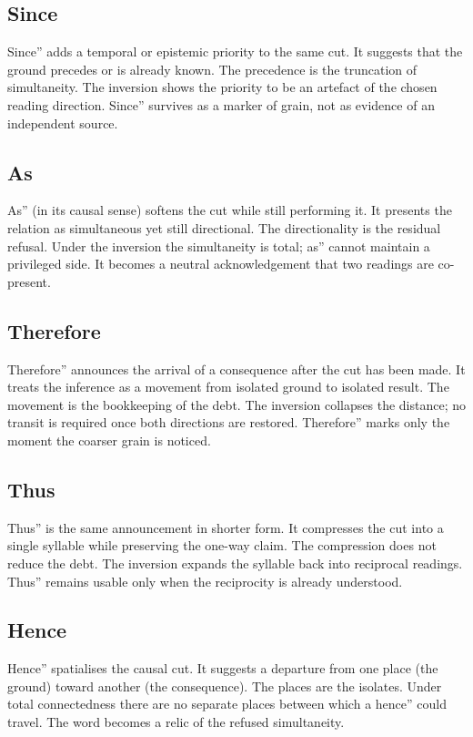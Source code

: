 \documentclass[11pt,a4paper]{article}
\begin{document}
\subsection{Since} Since'' adds a temporal or epistemic priority to the same cut. It suggests that the ground precedes or is already known. The precedence is the truncation of simultaneity. The inversion shows the priority to be an artefact of the chosen reading direction. Since'' survives as a marker of grain, not as evidence of an independent source.

\subsection{As} As'' (in its causal sense) softens the cut while still performing it. It presents the relation as simultaneous yet still directional. The directionality is the residual refusal. Under the inversion the simultaneity is total; as'' cannot maintain a privileged side. It becomes a neutral acknowledgement that two readings are co-present.

\subsection{Therefore} Therefore'' announces the arrival of a consequence after the cut has been made. It treats the inference as a movement from isolated ground to isolated result. The movement is the bookkeeping of the debt. The inversion collapses the distance; no transit is required once both directions are restored. Therefore'' marks only the moment the coarser grain is noticed.

\subsection{Thus} Thus'' is the same announcement in shorter form. It compresses the cut into a single syllable while preserving the one-way claim. The compression does not reduce the debt. The inversion expands the syllable back into reciprocal readings. Thus'' remains usable only when the reciprocity is already understood.

\subsection{Hence} Hence'' spatialises the causal cut. It suggests a departure from one place (the ground) toward another (the consequence). The places are the isolates. Under total connectedness there are no separate places between which a hence'' could travel. The word becomes a relic of the refused simultaneity.
\end{document}
